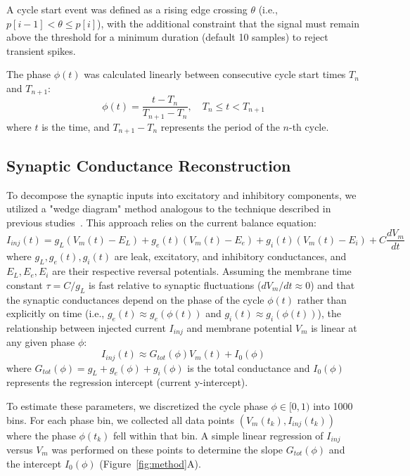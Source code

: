 \documentclass{article}
\begin{document}
A cycle start event was defined as a rising edge crossing $\theta$ (i.e., $p[i-1] < \theta \leq p[i]$), with the additional constraint that the signal must remain above the threshold for a minimum duration (default 10 samples) to reject transient spikes.

The phase $\phi(t)$ was calculated linearly between consecutive cycle start times $T_n$ and $T_{n+1}$:
\begin{equation}
    \phi(t) = \frac{t - T_n}{T_{n+1} - T_n}, \quad T_n \leq t < T_{n+1}
\end{equation}
where $t$ is the time, and $T_{n+1} - T_n$ represents the period of the $n$-th cycle.

\subsection{Synaptic Conductance Reconstruction}
To decompose the synaptic inputs into excitatory and inhibitory components, we utilized a "wedge diagram" method analogous to the technique described in previous studies~\citep{molkov2024inference}. This approach relies on the current balance equation:
\begin{equation}
    I_{inj}(t) = g_L (V_m(t) - E_L) + g_e(t) (V_m(t) - E_e) + g_i(t) (V_m(t) - E_i) + C \frac{dV_m}{dt}
\end{equation}
where $g_L, g_e(t), g_i(t)$ are leak, excitatory, and inhibitory conductances, and $E_L, E_e, E_i$ are their respective reversal potentials. Assuming the membrane time constant $\tau = C/g_L$ is fast relative to synaptic fluctuations ($dV_m/dt \approx 0$) and that the synaptic conductances depend on the phase of the cycle $\phi(t)$ rather than explicitly on time (i.e., $g_e(t) \approx g_e(\phi(t))$ and $g_i(t) \approx g_i(\phi(t))$), the relationship between injected current $I_{inj}$ and membrane potential $V_m$ is linear at any given phase $\phi$:
\begin{equation}
    I_{inj}(t) \approx G_{tot}(\phi) V_m(t) + I_{0}(\phi)
\end{equation}
where $G_{tot}(\phi) = g_L + g_e(\phi) + g_i(\phi)$ is the total conductance and $I_{0}(\phi)$ represents the regression intercept (current y-intercept).

To estimate these parameters, we discretized the cycle phase $\phi \in [0, 1)$ into 1000 bins. For each phase bin, we collected all data points $(V_m(t_k), I_{inj}(t_k))$ where the phase $\phi(t_k)$ fell within that bin. A simple linear regression of $I_{inj}$ versus $V_m$ was performed on these points to determine the slope $G_{tot}(\phi)$ and the intercept $I_0(\phi)$ (Figure~\ref{fig:method}A).
\end{document}
